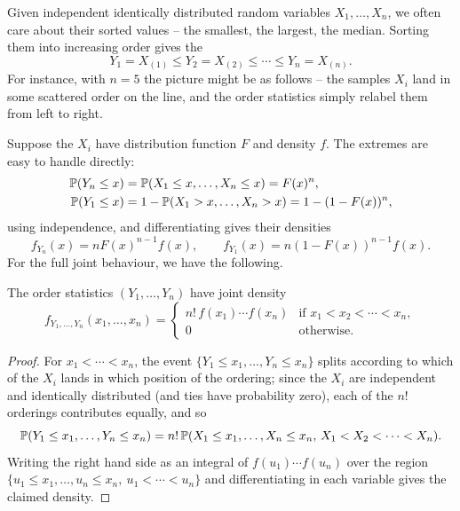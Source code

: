 \documentclass[a4paper]{scrartcl}
\begin{document}
Given independent identically distributed random variables $X_1, \dots, X_n$, we often care about their sorted values -- the smallest, the largest, the median. Sorting them into increasing order gives the 
$$
Y_1 = X_{(1)} \leq Y_2 = X_{(2)} \leq \cdots \leq Y_n = X_{(n)}.
$$
For instance, with $n = 5$ the picture might be as follows -- the samples $X_i$ land in some scattered order on the line, and the order statistics simply relabel them from left to right.
\begin{center}
\end{center}
Suppose the $X_i$ have distribution function $F$ and density $f$. The extremes are easy to handle directly:
\begin{align*}
	\mathbb{P}(Y_n \leq x) &= \mathbb{P}(X_1 \leq x, \dots, X_n \leq x) = F(x)^n, \\
	\mathbb{P}(Y_1 \leq x) &= 1 - \mathbb{P}(X_1 > x, \dots, X_n > x) = 1 - (1 - F(x))^n,
\end{align*}
using independence, and differentiating gives their densities
$$
f_{Y_n}(x) = nF(x)^{n - 1}f(x), \qquad f_{Y_1}(x) = n(1 - F(x))^{n-1} f(x).
$$
For the full joint behaviour, we have the following.

\begin{proposition}
	The order statistics $(Y_1, \dots, Y_n)$ have joint density
	$$
	f_{Y_1, \dots, Y_n}(x_1, \dots, x_n) = \begin{cases}
		n! \, f(x_1) \cdots f(x_n) & \text{if } x_1 < x_2 < \cdots < x_n, \\
		0 & \text{otherwise.}
	\end{cases}
	$$
\end{proposition}
\begin{proof}
	For $x_1 < \cdots < x_n$, the event $\{Y_1 \leq x_1, \dots, Y_n \leq x_n\}$ splits according to which of the $X_i$ lands in which position of the ordering; since the $X_i$ are independent and identically distributed (and ties have probability zero), each of the $n!$ orderings contributes equally, and so
	$$
	\mathbb{P}(Y_1 \leq x_1, \dots, Y_n \leq x_n) = n! \,\mathbb{P}(X_1 \leq x_1, \dots, X_n \leq x_n, \, X_1 < X_2 < \cdots < X_n).
	$$
	Writing the right hand side as an integral of $f(u_1)\cdots f(u_n)$ over the region $\{u_1 \leq x_1, \dots, u_n \leq x_n,\ u_1 < \cdots < u_n\}$ and differentiating in each variable gives the claimed density.
\end{proof}
\end{document}
